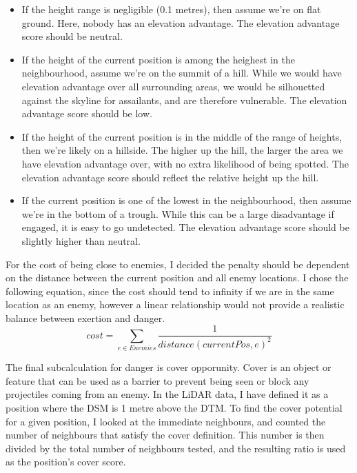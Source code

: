 \documentclass[12pt,a4paper]{article}
\begin{document}
  \begin{itemize}
    \item If the height range is negligible (0.1 metres), then assume we're on flat ground. Here, nobody has an elevation advantage. The elevation advantage score should be neutral.
    \item If the height of the current position is among the heighest in the neighbourhood, assume we're on the summit of a hill. While we would have elevation advantage over all surrounding areas, we would be silhouetted against the skyline for assailants, and are therefore vulnerable. The elevation advantage score should be low.
    \item If the height of the current position is in the middle of the range of heights, then we're likely on a hillside. The higher up the hill, the larger the area we have elevation advantage over, with no extra likelihood of being spotted. The elevation advantage score should reflect the relative height up the hill.
    \item If the current position is one of the lowest in the neighbourhood, then assume we're in the bottom of a trough. While this can be a large disadvantage if engaged, it is easy to go undetected. The elevation advantage score should be slightly higher than neutral.
  \end{itemize}
  \par For the cost of being close to enemies, I decided the penalty should be dependent on the distance between the current position and all enemy locations. I chose the following equation, since the cost should tend to infinity if we are in the same location as an enemy, however a linear relationship would not provide a realistic balance between exertion and danger.
  \begin{equation*}
    cost = \sum\limits_{e \in Enemies} \frac{1}{distance(currentPos, e)^{2}}
  \end{equation*}
  \par The final subcalculation for danger is cover opporunity. Cover is an object or feature that can be used as a barrier to prevent being seen or block any projectiles coming from an enemy. In the LiDAR data, I have defined it as a position where the DSM is 1 metre above the DTM. To find the cover potential for a given position, I looked at the immediate neighbours, and counted the number of neighbours that satisfy the cover definition. This number is then divided by the total number of neighbours tested, and the resulting ratio is used as the position's cover score.
\end{document}
